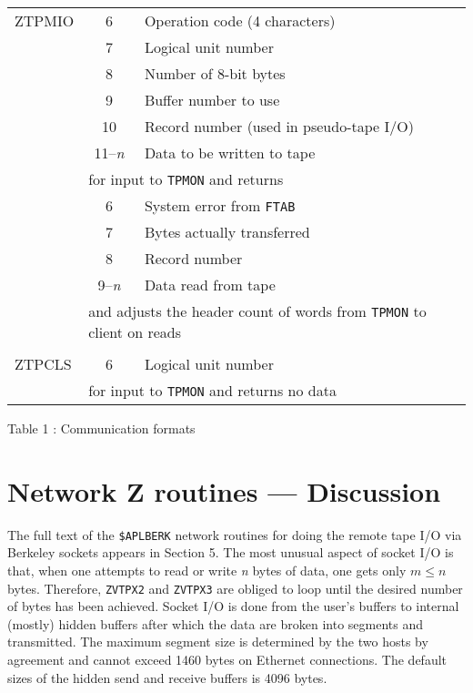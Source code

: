 \begin{center}
\begin{tabular}{lcl}
ZTPMIO & 6    & Operation code (4 characters)\\
       & 7    & Logical unit number\\
       & 8    & Number of 8-bit bytes\\
       & 9    & Buffer number to use\\
       & 10   & Record number (used in pseudo-tape I/O)\\
       & 11--{\it n} & Data to be written to tape\\
       &\multicolumn{2}{l}{for input to {\tt TPMON} and returns}\\
       & 6    & System error from {\tt FTAB}\\
       & 7    & Bytes actually transferred\\
       & 8    & Record number\\
       & 9--{\it n} & Data read from tape\\
       &\multicolumn{2}{l}{and adjusts the header count of words from
                {\tt TPMON} to client on reads}\\
\hline
       &      & \\
ZTPCLS & 6    & Logical unit number\\
       &\multicolumn{2}{l}{for input to {\tt TPMON} and returns no data}\\
\hline
\hline
\end{tabular}
\end{center}
\begin{center}
Table 1 : Communication formats
\end{center}
\vfil\pagebreak

\section{Network Z routines --- Discussion}

The full text of the {\tt \$APLBERK} network routines for doing the
remote tape I/O via Berkeley sockets appears in Section 5.  The most
unusual aspect of socket I/O is that, when one attempts to read or
write {\it n} bytes of data, one gets only $m \leq n$ bytes.
Therefore, {\tt ZVTPX2} and {\tt ZVTPX3} are obliged to loop until the
desired number of bytes has been achieved.  Socket I/O is done from
the user's buffers to internal (mostly) hidden buffers after which the
data are broken into segments and transmitted.  The maximum segment
size is determined by the two hosts by agreement and cannot exceed
1460 bytes on Ethernet connections.  The default sizes of the hidden
send and receive buffers is 4096 bytes.


